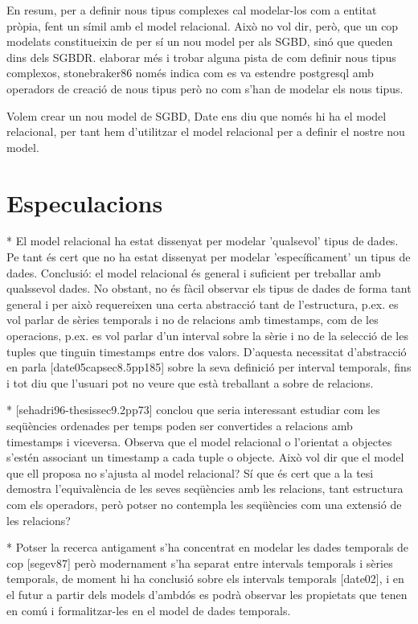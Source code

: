 En resum, per a definir nous tipus complexes cal modelar-los com a entitat pròpia, fent un símil amb el model relacional. Això no vol dir, però, que un cop modelats constitueixin de per sí un nou model per als SGBD, sinó que queden dins dels SGBDR.  elaborar més i trobar alguna pista de com definir nous tipus complexos, stonebraker86 només indica com es va estendre postgresql amb operadors de creació de nous tipus però no com s'han de modelar els nous tipus.

Volem crear un nou model de SGBD, Date ens diu que només hi ha el model relacional, per tant hem d'utilitzar el model relacional per a definir el nostre nou model.



\section{Especulacions}

* El model relacional ha estat dissenyat per modelar 'qualsevol' tipus de dades. Pe tant és cert que no ha estat dissenyat per modelar 'específicament' un tipus de dades. Conclusió: el model relacional és general i suficient per treballar amb qualssevol dades. No obstant, no és fàcil observar els tipus de dades de forma tant general i per això requereixen una certa abstracció tant de l'estructura, p.ex. es vol parlar de sèries temporals i no de relacions amb timestamps, com de les operacions, p.ex. es vol parlar d'un interval sobre la sèrie i no de la selecció de les tuples que tinguin timestamps entre dos valors. D'aquesta necessitat d'abstracció en parla [date05capsec8.5pp185] sobre la seva definició per interval temporals, fins i tot diu que l'usuari pot no veure que està treballant a sobre de relacions.


* [sehadri96-thesissec9.2pp73] conclou que seria interessant estudiar com les seqüències ordenades per temps poden ser convertides a relacions amb timestamps i viceversa. Observa que el model relacional o l'orientat a objectes s'estén associant un timestamp a cada tuple o objecte. Això vol dir que el model que ell proposa no s'ajusta al model relacional? Sí que és cert que a la tesi demostra l'equivalència de les seves seqüències amb les relacions, tant estructura com els operadors, però potser no contempla les seqüències com una extensió de les relacions?


* Potser la recerca antigament s'ha concentrat en modelar les dades temporals de cop [segev87] però modernament s'ha separat entre intervals temporals i sèries temporals, de moment hi ha conclusió sobre els intervals temporals [date02], i en el futur a partir dels models d'ambdós es podrà observar les propietats que tenen en comú i formalitzar-les en el model de dades temporals.





